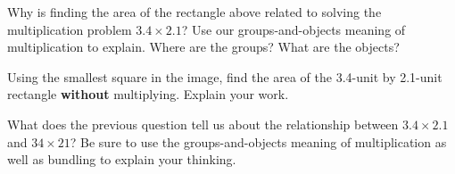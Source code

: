\documentclass{ximera}
\begin{document}
\begin{problem}
Why is finding the area of the rectangle above related to solving the multiplication problem $3.4 \times 2.1$? Use our groups-and-objects meaning of multiplication to explain. Where are the groups? What are the objects?
\end{problem}

\begin{problem}
Using the smallest square in the image, find the area of the 3.4-unit by 2.1-unit rectangle {\bf without} multiplying. Explain your work.

\begin{image}
\end{image}
\end{problem}

\begin{problem}
What does the previous question tell us about the relationship between $3.4 \times 2.1$ and $34 \times 21$? Be sure to use the groups-and-objects meaning of multiplication as well as bundling to explain your thinking.
\end{problem}


\newpage
\end{document}

